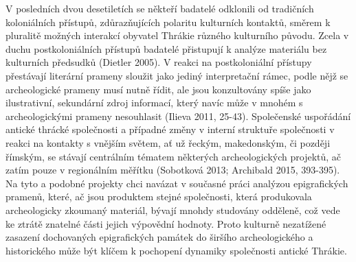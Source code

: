 V posledních dvou desetiletích se někteří badatelé odklonili od tradičních koloniálních přístupů, zdůrazňujících polaritu kulturních kontaktů, směrem k pluralitě možných interakcí obyvatel Thrákie různého kulturního původu. Zcela v duchu postkoloniálních přístupů badatelé přistupují k analýze materiálu bez kulturních předsudků (Dietler 2005). V reakci na postkoloniální přístupy přestávají literární prameny sloužit jako jediný interpretační rámec, podle nějž se archeologické prameny musí nutně řídit, ale jsou konzultovány spíše jako ilustrativní, sekundární zdroj informací, který navíc může v mnohém s archeologickými prameny nesouhlasit (Ilieva 2011, 25-43). Společenské uspořádání antické thrácké společnosti a případné změny v interní struktuře společnosti v reakci na kontakty s vnějším světem, ať už řeckým, makedonským, či později římským, se stávají centrálním tématem některých archeologických projektů, ač zatím pouze v regionálním měřítku (Sobotková 2013; Archibald 2015, 393-395). Na tyto a podobné projekty chci navázat v současné práci analýzou epigrafických pramenů, které, ač jsou produktem stejné společnosti, která produkovala archeologicky zkoumaný materiál, bývají mnohdy studovány odděleně, což vede ke ztrátě znatelné části jejich výpovědní hodnoty. Proto kulturně nezatížené zasazení dochovaných epigrafických památek do širšího archeologického a historického může být klíčem k pochopení dynamiky společnosti antické Thrákie.

